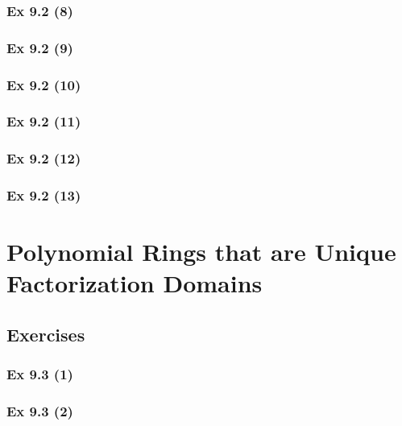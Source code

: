 \subsubsection{Ex 9.2 (8)}\label{sec:Ex_9.2.8}

\subsubsection{Ex 9.2 (9)}\label{sec:Ex_9.2.9}

\subsubsection{Ex 9.2 (10)}\label{sec:Ex_9.2.10}

\newpage		%

\subsubsection{Ex 9.2 (11)}\label{sec:Ex_9.2.11}

\subsubsection{Ex 9.2 (12)}\label{sec:Ex_9.2.12}

\subsubsection{Ex 9.2 (13)}\label{sec:Ex_9.2.13}

\newpage		%

\section{Polynomial Rings that are Unique\\ Factorization Domains}\label{sec:9.3}	
\subsection*{Exercises}\label{sec:9.3_Exercises}

\subsubsection{Ex 9.3 (1)}\label{sec:Ex_9.3.1}

\subsubsection{Ex 9.3 (2)}\label{sec:Ex_9.3.2}

